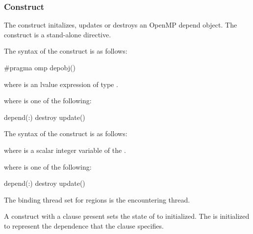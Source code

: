 \subsubsection{ Construct}
\label{subsubsec:depobj Construct}
\summary
The  construct initalizes, updates or destroys an OpenMP depend 
object. The  construct is a stand-alone directive.

\syntax

\begin{ccppspecific}
\begin{samepage}
The syntax of the  construct is as follows:

\begin{ompcPragma}
#pragma omp depobj() 
\end{ompcPragma}
\end{samepage}
where  is an lvalue expression of type .

where  is one of the following{}:

\begin{indentedcodelist}
depend(:)
destroy
update()
\end{indentedcodelist}
\end{ccppspecific}

\begin{fortranspecific}
The syntax of the  construct is as follows:

\begin{ompfPragma}
!$omp depobj(\plc{depobj) \plc{clause}
\end{ompfPragma}
where  is a scalar integer variable of the  .

where  is one of the following{}:

\begin{indentedcodelist}
depend(:)
destroy
update()
\end{indentedcodelist}
\end{fortranspecific}

\binding
The binding thread set for  regions is the encountering thread.

\descr
A  construct with a  clause present sets the state 
of  to initialized. The  is initialized to represent 
the dependence that the  clause specifies.

